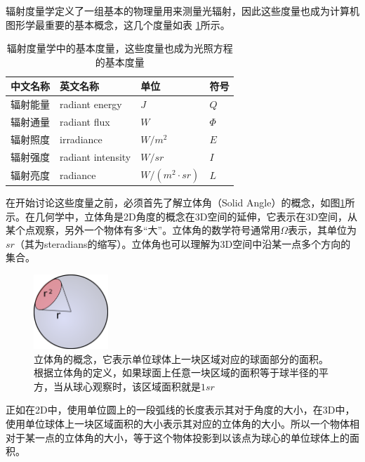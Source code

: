 辐射度量学定义了一组基本的物理量用来测量光辐射，因此这些度量也成为计算机图形学最重要的基本概念，这几个度量如表 \ref{t:radiometric-quantities}所示。

\begin{table}
\caption{辐射度量学中的基本度量，这些度量也成为光照方程的基本度量}
\label{t:radiometric-quantities}

\begin{tabular}{p{}|p{}|p{}|p{}}
\hline
   中文名称&英文名称&单位&符号  \\
  \hline
  辐射能量&radiant energy & $J$& $Q$\\
  辐射通量&radiant flux & $W$  & $\Phi$\\
  辐射照度&irradiance & $W/m^2$ & $E$\\
  辐射强度&radiant intensity & $W/sr$ & $I$\\
  辐射亮度&radiance & $W/(m^2\cdot sr)$& $L$\\
\hline
\end{tabular}
\end{table}

在开始讨论这些度量之前，必须首先了解立体角（Solid Angle）的概念，如图\ref{f:intro-solid-angle}所示。在几何学中，立体角是2D角度的概念在3D空间的延伸，它表示在3D空间，从某个点观察，另外一个物体有多“大”。立体角的数学符号通常用$\Omega$表示，其单位为$sr$（其为steradians的缩写）。立体角也可以理解为3D空间中沿某一点多个方向的集合。

\begin{figure}
\sidecaption
	\includegraphics[width=0.25\textwidth]{figures/intro/solid-angle}
	\caption{立体角的概念，它表示单位球体上一块区域对应的球面部分的面积。根据立体角的定义，如果球面上任意一块区域的面积等于球半径的平方，当从球心观察时，该区域面积就是$1sr$}
	\label{f:intro-solid-angle}
\end{figure}

正如在2D中，使用单位圆上的一段弧线的长度表示其对于角度的大小，在3D中，使用单位球体上一块区域面积的大小表示其对应的立体角的大小。所以一个物体相对于某一点的立体角的大小，等于这个物体投影到以该点为球心的单位球体上的面积。

